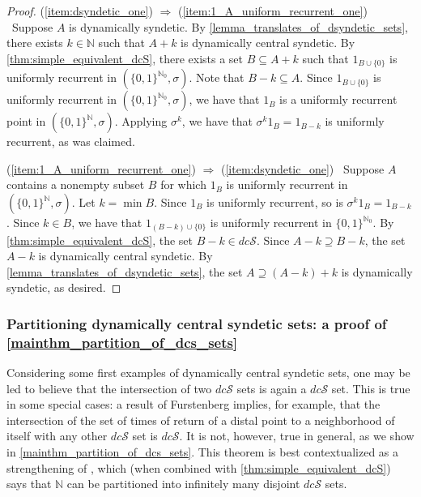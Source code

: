 \documentclass[letter,11pt]{article}
\theoremstyle{plain}
\theoremstyle{definition}
\theoremstyle{plain}
\theoremstyle{plain}
\numberwithin{equation}{section}
\newcommand{\N}{\mathbb{N}}
\newcommand{\dcsyndetic}{dc\mathcal{S}}
\begin{document}
\begin{proof}
    (\ref{item:dsyndetic_one}) $\Rightarrow$ (\ref{item:1_A_uniform_recurrent_one}) \ Suppose $A$ is dynamically syndetic. By \cref{lemma_translates_of_dsyndetic_sets}, there exists $k \in \N$ such that $A + k$ is dynamically central syndetic. By \cref{thm:simple_equivalent_dcS}, there exists a set $B \subseteq A + k$ such that $1_{B \cup \{0\}}$ is uniformly recurrent in $(\{0, 1\}^{\N_0},\sigma)$. Note that $B - k \subseteq A$.  Since $1_{B \cup \{0\}}$ is uniformly recurrent in $(\{0, 1\}^{\N_0},\sigma)$, we have that $1_{B}$ is a uniformly recurrent point in $(\{0, 1\}^{\N},\sigma)$.  Applying $\sigma^k$, we have that $\sigma^k 1_B = 1_{B-k}$ is uniformly recurrent, as was claimed.  

    (\ref{item:1_A_uniform_recurrent_one}) $\Rightarrow$ (\ref{item:dsyndetic_one}) \ 
    Suppose $A$ contains a nonempty subset $B$ for which $1_{B}$ is uniformly recurrent in $(\{0, 1\}^{\N},\sigma)$. Let $k = \min B$. Since $1_{B}$ is uniformly recurrent, so is $\sigma^k 1_B = 1_{B-k}$.  Since $k \in B$, we have that $1_{(B-k) \cup \{0\}}$ is uniformly recurrent in $\{0, 1\}^{\N_0}$. By \cref{thm:simple_equivalent_dcS}, the set $B - k \in \dcsyndetic$. Since $A - k \supseteq B - k$, the set $A - k$ is dynamically central syndetic.  By \cref{lemma_translates_of_dsyndetic_sets}, the set $A \supseteq (A-k) + k$ is dynamically syndetic, as desired.
\end{proof}


\subsubsection{Partitioning dynamically central syndetic sets: a proof of \cref{mainthm_partition_of_dcs_sets}}
\label{sec_partitioning_dcs_sets}


Considering some first examples of dynamically central syndetic sets, one may be led to believe that the intersection of two $\dcsyndetic$ sets is again a $\dcsyndetic$ set.  This is true in some special cases: a result of Furstenberg \cite[Thm. 9.11]{furstenberg_book_1981} implies, for example, that the intersection of the set of times of return of a distal point to a neighborhood of itself with any other $\dcsyndetic$ set is $\dcsyndetic$.  It is not, however, true in general, as we show in \cref{mainthm_partition_of_dcs_sets}.  This theorem is best contextualized as a strengthening of \cite[Thm. 2.13]{bergelson_hindman_strauss_2012}, which (when combined with \cref{thm:simple_equivalent_dcS}) says that $\N$ can be partitioned into infinitely many disjoint $\dcsyndetic$ sets.
\end{document}
